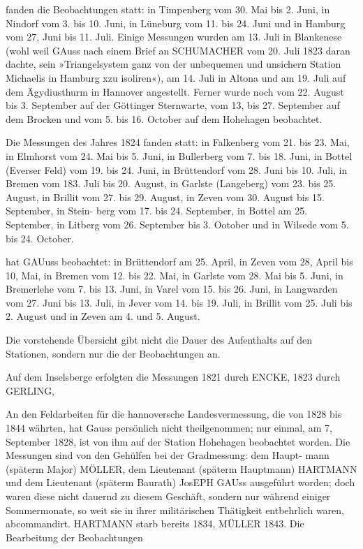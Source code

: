 \documentclass[12pt,a4paper]{article}
\theoremstyle{plain}
\theoremstyle{definition}
\theoremstyle{remark}
\begin{document}
 fanden die Beobachtungen statt: in Timpenberg vom 30. Mai bis 2. Juni, in Nindorf vom 3. bis
10. Juni, in Lüneburg vom 11. bis 24. Juni und in Hamburg vom 27, Juni bis 11. Juli. Einige Messungen
wurden am 13. Juli in Blankenese (wohl weil GAuss nach einem Brief an SCHUMACHER vom 20. Juli 1823
daran dachte, sein »Triangelsystem ganz von der unbequemen und unsichern Station Michaelis in Hamburg
xzu isoliren«), am 14. Juli in Altona und am 19. Juli auf dem Ägydiusthurm in Hannover angestellt. Ferner
wurde noch vom 22. August bis 3. September auf der Göttinger Sternwarte, vom 13, bis 27. September auf
dem Brocken und vom 5. bis 16. October auf dem Hohehagen beobachtet.

\noindent
Die Messungen des Jahres 1824 fanden statt: in Falkenberg vom 21. bis 23. Mai, in Elmhorst vom
24. Mai bis 5. Juni, in Bullerberg vom 7. bis 18. Juni, in Bottel (Everser Feld) vom 19. bis 24. Juni, in
Brüttendorf vom 28. Juni bis 10. Juli, in Bremen vom 183. Juli bis 20. August, in Garlste (Langeberg) vom
23. bis 25. August, in Brillit vom 27. bis 29. August, in Zeven vom 30. August bis 15. September, in Stein-
berg vom 17. bis 24. September, in Bottel am 25. September, in Litberg vom 26. September bis 3. Ootober
und in Wilsede vom 5. bis 24. October.

 hat GAUuss beobachtet: in Brüttendorf am 25. April, in Zeven vom 28, April bis 10, Mai, in
Bremen vom 12. bis 22. Mai, in Garlste vom 28. Mai bis 5. Juni, in Bremerlehe vom 7. bis 13. Juni, in
Varel vom 15. bis 26. Juni, in Langwarden vom 27. Juni bis 13. Juli, in Jever vom 14. bis 19. Juli, in
Brillit vom 25. Juli bis 2. August und in Zeven am 4. und 5. August.

\noindent
Die vorstehende Übersicht gibt nicht die Dauer des Aufenthalts auf den Stationen, sondern nur die
der Beobachtungen an.

\noindent
Auf dem Inselsberge erfolgten die Messungen 1821 durch ENCKE, 1823 durch GERLING,

\noindent
An den Feldarbeiten für die hannoversche Landesvermessung, die von 1828 bis 1844 währten, hat
Gauss persönlich nicht theilgenommen; nur einmal, am 7, September 1828, ist von ihm auf der Station
Hohehagen beobachtet worden. Die Messungen sind von den Gehülfen bei der Gradmessung: dem Haupt-
mann (späterm Major) MÖLLER, dem Lieutenant (späterm Hauptmann) HARTMANN und dem Lieutenant
(späterm Baurath) JosEPH GAUss ausgeführt worden; doch waren diese nicht dauernd zu diesem Geschäft,
sondern nur während einiger Sommermonate, so weit sie in ihrer militärischen Thätigkeit entbehrlich
waren, abcommandirt. HARTMANN starb bereits 1834, MÜLLER 1843. Die Bearbeitung der Beobachtungen
\end{document}
